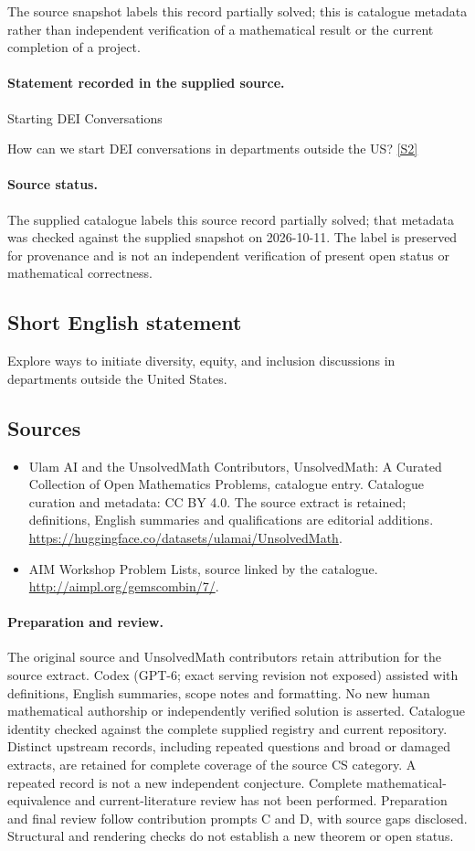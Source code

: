 \documentclass[11pt]{article}
\begin{document}
The source snapshot labels this record partially solved; this is catalogue metadata rather than independent verification of a mathematical result or the current completion of a project.
\paragraph{Statement recorded in the supplied source.}
Starting DEI Conversations

How can we start DEI conversations in departments outside the US? \href{http://aimpl.org/gemscombin/7/}{[S2]}
\paragraph{Source status.}
The supplied catalogue labels this source record partially solved; that metadata was checked against the supplied snapshot on 2026-10-11. The label is preserved for provenance and is not an independent verification of present open status or mathematical correctness.
\subsection{Short English statement}
Explore ways to initiate diversity, equity, and inclusion discussions in departments outside the United States.
\subsection{Sources}
\begin{itemize}
\item[S1] Ulam AI and the UnsolvedMath Contributors, UnsolvedMath: A Curated Collection of Open Mathematics Problems, catalogue entry. Catalogue curation and metadata: CC BY 4.0. The source extract is retained; definitions, English summaries and qualifications are editorial additions.
\url{https://huggingface.co/datasets/ulamai/UnsolvedMath}.
\item[S2] AIM Workshop Problem Lists, source linked by the catalogue.
\url{http://aimpl.org/gemscombin/7/}.
\end{itemize}
\paragraph{Preparation and review.}
The original source and UnsolvedMath contributors retain attribution for the source extract. Codex (GPT-6; exact serving revision not exposed) assisted with definitions, English summaries, scope notes and formatting. No new human mathematical authorship or independently verified solution is asserted. Catalogue identity checked against the complete supplied registry and current repository. Distinct upstream records, including repeated questions and broad or damaged extracts, are retained for complete coverage of the source CS category. A repeated record is not a new independent conjecture. Complete mathematical-equivalence and current-literature review has not been performed. Preparation and final review follow contribution prompts C and D, with source gaps disclosed. Structural and rendering checks do not establish a new theorem or open status.
\label{end:statement}
\end{document}
